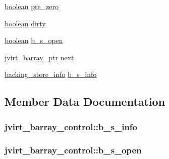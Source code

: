 \begin{DoxyCompactItemize}
\hyperlink{jmorecfg_8h_a7c6368b321bd9acd0149b030bb8275ed}{boolean} \hyperlink{structjvirt__barray__control_a40d3b399333a4d0468c7fcb4465e4cdd}{pre\+\_\+zero}
\item 
\hyperlink{jmorecfg_8h_a7c6368b321bd9acd0149b030bb8275ed}{boolean} \hyperlink{structjvirt__barray__control_a324c033c65e470a10556ba02619c453c}{dirty}
\item 
\hyperlink{jmorecfg_8h_a7c6368b321bd9acd0149b030bb8275ed}{boolean} \hyperlink{structjvirt__barray__control_a5b588561840b293882bcf69e690962b2}{b\+\_\+s\+\_\+open}
\item 
\hyperlink{jpeglib_8h_a994f4cba141d82ded90af38e51223f0b}{jvirt\+\_\+barray\+\_\+ptr} \hyperlink{structjvirt__barray__control_ae4b8dea777dcac10f1de982f0bedac0e}{next}
\item 
\hyperlink{jmemsys_8h_a053e143ffd76dfe3b362c09f7019ea93}{backing\+\_\+store\+\_\+info} \hyperlink{structjvirt__barray__control_a6b33df0220c0545b4d7c7a8563a7fb18}{b\+\_\+s\+\_\+info}
\end{DoxyCompactItemize}


\subsection{Member Data Documentation}
\hypertarget{structjvirt__barray__control_a6b33df0220c0545b4d7c7a8563a7fb18}{}
\subsubsection[{b\+\_\+s\+\_\+info}]{ jvirt\+\_\+barray\+\_\+control\+::b\+\_\+s\+\_\+info}\label{structjvirt__barray__control_a6b33df0220c0545b4d7c7a8563a7fb18}
\hypertarget{structjvirt__barray__control_a5b588561840b293882bcf69e690962b2}{}
\subsubsection[{b\+\_\+s\+\_\+open}]{ jvirt\+\_\+barray\+\_\+control\+::b\+\_\+s\+\_\+open}\label{structjvirt__barray__control_a5b588561840b293882bcf69e690962b2}
\hypertarget{structjvirt__barray__control_a6c148bce80b027c114ec7d37221cd175}{}
